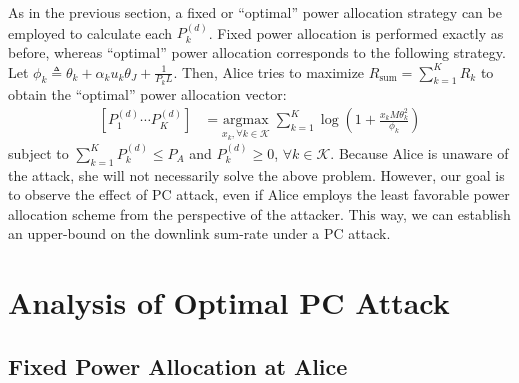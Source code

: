 \documentclass[draftclsnofoot, 12pt, onecolumn, journal]{IEEEtran}
\begin{document}
As in the previous section, a fixed or ``optimal'' power allocation strategy can be employed to calculate each $P_k^{(d)}$.
Fixed power allocation is performed exactly as before, whereas ``optimal'' power allocation corresponds to the following strategy.
Let $\phi_k \triangleq \theta_k + \alpha_k u_k \theta_J + \frac{1}{P_k L}$.
Then, Alice tries to maximize $R_{\text{sum}} = \sum_{k=1}^K R_k$ to obtain the ``optimal'' power allocation vector:
%
\begin{align}
\left[ P_1^{(d)} \cdots P_K^{(d)} \right] &= \underset{ x_k, \forall k \in \mathcal{K} }{ \text{argmax}} \; \sum_{k = 1}^K \log \left( 1 + \frac{x_k M \theta_k^2}{\phi_k} \right)
\end{align}
%
subject to $\sum_{k = 1}^K P_k^{(d)} \leq P_A$ and $P_k^{(d)} \geq 0$, $\forall k \in \mathcal{K}$.
Because Alice is unaware of the attack, she will not necessarily solve the above problem.
However, our goal is to observe the effect of PC attack, even if Alice employs the least favorable power allocation scheme from the perspective of the attacker.
This way, we can establish an upper-bound on the downlink sum-rate under a PC attack.

\section{Analysis of Optimal PC Attack}
\label{sec:optimal_PC_att}

\subsection{Fixed Power Allocation at Alice}
\label{subsec:uniformPA}
\end{document}
